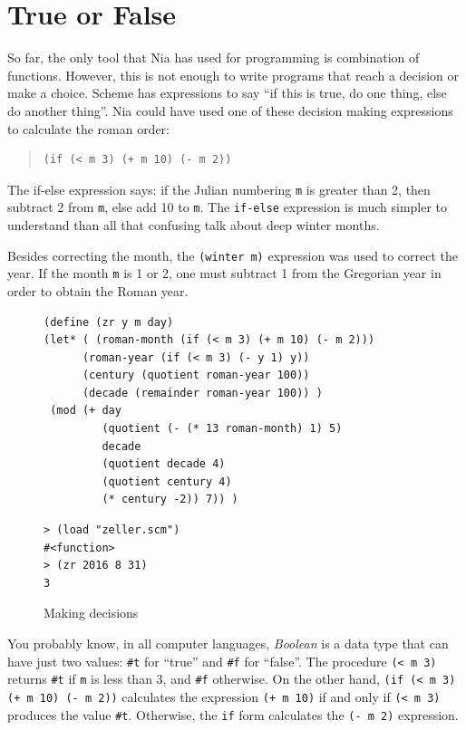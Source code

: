 \documentclass[a4paper,12pt]{book}
\newenvironment{fmpage}[1]
           {\begin{lrbox}{\fmbox}\begin{minipage}{#1}}
           {\end{minipage}\end{lrbox}\fbox{\usebox{\fmbox}}}
\begin{document}
\section{True or False}
So far, the only tool that Nia has used
for programming is combination of functions.
However, this is not enough to write
programs that reach a decision or
make a choice. Scheme has expressions
to say ``if this is true, do one thing,
else do another thing''. Nia 
could have used one of these decision
making expressions to calculate the roman
order:
\begin{quote}
\begin{verbatim}
(if (< m 3) (+ m 10) (- m 2))
\end{verbatim}
\end{quote}
The if-else expression says: if the
Julian numbering \verb|m| is greater
than 2, then subtract 2 from \verb|m|,
else add 10 to \verb|m|. The \verb|if-else|
expression is much simpler to understand
than all that confusing talk about deep
winter months.

Besides correcting the month, the \verb|(winter m)|
expression was used to correct the year. If
the month \verb|m| is 1 or 2, one must subtract
1 from the Gregorian year in order to obtain
the Roman year.

\begin{figure}[!b]
\begin{fmpage}{0.9\linewidth}
\begin{verbatim}
(define (zr y m day)
(let* ( (roman-month (if (< m 3) (+ m 10) (- m 2)))
      (roman-year (if (< m 3) (- y 1) y))
      (century (quotient roman-year 100))
      (decade (remainder roman-year 100)) )
 (mod (+ day
         (quotient (- (* 13 roman-month) 1) 5)
         decade
         (quotient decade 4)
         (quotient century 4)
         (* century -2)) 7)) )
\end{verbatim}
\end{fmpage}

\begin{fmpage}{0.9\linewidth}
\begin{verbatim}
> (load "zeller.scm")
#<function>
> (zr 2016 8 31)
3
\end{verbatim}
\end{fmpage}
\caption{Making decisions}
\label{fig:zeller}
\end{figure}

You probably know, in all computer
languages, {\em Boolean} is a data type
that can have just two values: \verb|#t|
for ``true'' and \verb|#f| for ``false''.
The procedure \verb|(< m 3)| returns
\verb|#t| if \verb|m| is less than 3,
and \verb|#f| otherwise. On the other
hand, \verb|(if (< m 3) (+ m 10) (- m 2))|
calculates the expression \verb|(+ m 10)|
if and only if \verb|(< m 3)| produces
the value \verb|#t|. Otherwise, the
\verb|if| form calculates the \verb|(- m 2)|
expression.
\end{document}
